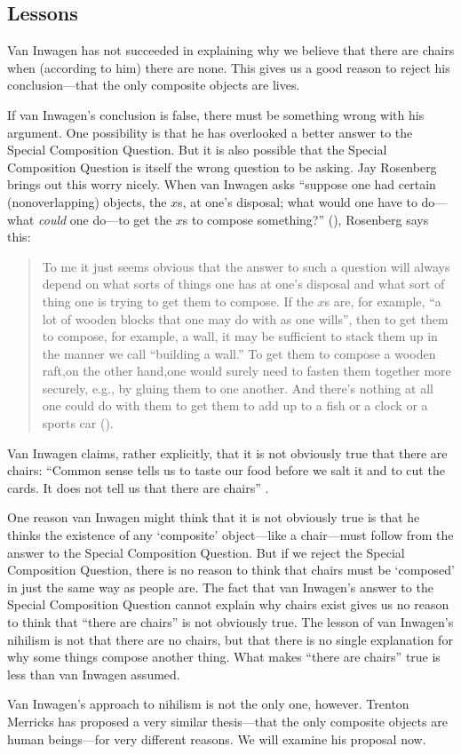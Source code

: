 \documentclass[11pt]{article}
\begin{document}
\begin{spacing}{1.5}
\section{Lessons}
\label{lessons-v}
Van Inwagen has not succeeded in explaining why we believe that there
are chairs when (according to him) there are none.  This gives us a
good reason to reject his conclusion---that the only composite objects
are lives.

If van Inwagen's conclusion is false, there must be something wrong
with his argument.  One possibility is that he has overlooked a better
answer to the Special Composition Question.  But it is also possible
that the Special Composition Question is itself the wrong question to
be asking.  Jay Rosenberg brings out this worry nicely.  When van
Inwagen asks ``suppose one had certain (nonoverlapping) objects, the
$x$s, at one's disposal; what would one have to do---what {\em could}
one do---to get the $x$s to compose something?''
(\citeyear[31]{inwagen1995}), Rosenberg says this:

\begin{quote}
To me it just seems obvious that the answer to such a question will
always depend on what sorts of things one has at one's disposal and
what sort of thing one is trying to get them to compose. If the $x$s
are, for example, ``a lot of wooden blocks that one may do with as one
wills'', then to get them to compose, for example, a wall, it may be
sufficient to stack them up in the manner we call ``building a wall.''
To get them to compose a wooden raft,on the other hand,one would
surely need to fasten them together more securely, e.g., by gluing
them to one another. And there's nothing at all one could do with them
to get them to add up to a fish or a clock or a sports car
(\citeyear[705]{rosenberg1993}).
\end{quote}

Van Inwagen claims, rather explicitly, that it is not obviously true
that there are chairs: ``Common sense tells us to taste our food
before we salt it and to cut the cards.  It does not tell us that
there are chairs'' \citeyearpar[103]{inwagen1995}.

One reason van Inwagen might think that it is not obviously true is
that he thinks the existence of any `composite' object---like a
chair---must follow from the answer to the Special Composition
Question.  But if we reject the Special Composition Question, there is
no reason to think that chairs must be `composed' in just the same way
as people are.  The fact that van Inwagen's answer to the Special
Composition Question cannot explain why chairs exist gives us no
reason to think that ``there are chairs'' is not obviously true.  The
lesson of van Inwagen's nihilism is not that there are no chairs, but
that there is no single explanation for why some things compose
another thing.  What makes ``there are chairs'' true is less than van
Inwagen assumed.

Van Inwagen's approach to nihilism is not the only one, however.
Trenton Merricks has proposed a very similar thesis---that the only
composite objects are human beings---for very different reasons.  We
will examine his proposal now.

\ifstandalone
\end{spacing}


\fi
\end{document}
